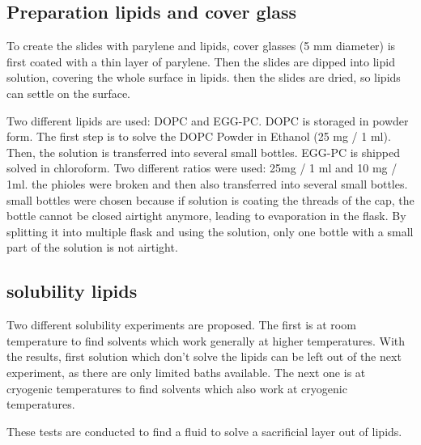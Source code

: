 \subsection{Preparation lipids and cover glass}

To create the slides with parylene and lipids, cover glasses (5 mm diameter) is first coated with a thin layer of parylene. Then the slides are dipped into lipid solution, covering the whole surface in lipids. then the slides are dried, so lipids can settle on the surface. 

Two different lipids are used: DOPC and EGG-PC. DOPC is storaged in powder form. The first step is to solve the DOPC Powder in Ethanol (25 mg / 1 ml). Then, the solution is transferred into several small bottles. EGG-PC is shipped solved in chloroform. Two different ratios were used: 25mg / 1 ml and 10 mg / 1ml. the phioles were broken and then also transferred into several small bottles. small bottles were chosen because if solution is coating the threads of the cap, the bottle cannot be closed airtight anymore, leading to evaporation in the flask. By splitting it into multiple flask and using the solution, only one bottle with a small part of the solution is not airtight.

\subsection{solubility lipids}

Two different solubility experiments are proposed. The first is at room temperature to find solvents which work generally at higher temperatures. With the results, first solution which don't solve the lipids can be left out of the next experiment, as there are only limited baths available. The next one is at cryogenic temperatures to find solvents which also work at cryogenic temperatures.

These tests are conducted to find a fluid to solve a sacrificial layer out of lipids.

\begin{comment}
\begin{figure}[hbt!]
	\centering
	\begin{picture}(6,3)
		\multiput(0,0)(6,0){2}{\line(0,1){1.25}}
		\put(0,0){\line(1,0){6}}
		\multiput(0,.5)(0,.25){4}{\line(1,0){6}}
		\multiput(0,0)(0.5,0){12}{\line(1,1){0.5}}
		\multiput(6,0.5)(-0.25,0){24}{\line(-1,1){0.25}}
		\thicklines
		\put(-1,.25){\vector(1,0){1}}
		\put(-1,.25){\makebox(0,0)[r]{Slide}}
		\put(7,.625){\vector(-1,0){1}}
		\put(7,.625){\makebox(0,0)[l]{Parylene}}
		\put(-1,.875){\vector(1,0){1}}
		\put(-1,.875){\makebox(0,0)[r]{Lipid Layer}}
		\put(7,1.125){\vector(-1,0){1}}
		\put(7,1.125){\makebox(0,0)[l]{Ice}}
	\end{picture}
	\caption{Sacrificial layer}
	\label{fig:sacrificial layer}
\end{figure}
\end{comment}


